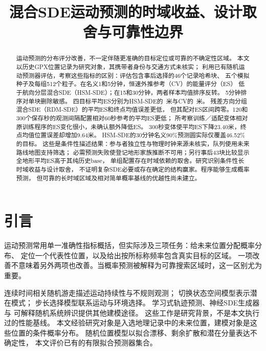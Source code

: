 

\title{混合SDE运动预测的时域收益、设计取舍与可靠性边界}

\pagestyle{plain}
\maketitle
\begin{abstract}
运动预测的分布评分改善，不一定伴随更准确的目标定位或可靠的不确定性区域。
本文以历史GPX位置记录为研究对象，其携带者身份与交通方式未核实；
利用已有随机运动预测器评估，考察这些指标的区别：评估包含事后选择的46个记录哈希块、
五个模拟种子及每组512个粒子。在名义1和5分钟，恒速外推参考（CV）的能量评分（ES）
低于航向分层混合SDE（HSM-SDE）；在15和30分钟，两者样本均值排序反转。
5分钟排序对单块删除敏感。
四目标平均ES分别为HSM-SDE的\FullES\ 米与CV的\InertialES\ 米。
残差方向分组混合SDE（RDM-SDE）的平均ES和终点均值误差更低，
但其配对ES区间跨零。120和300个保存秒的观测间隔配置相对60秒参考的平均ES更低；
所考察训练／适配变体相对原训练程序的ES变化很小，未确认额外降低ES。
300秒变体使平均ES下降23.40米，终点均值位置误差却增加9.64米。
HSM-SDE的30分钟名义90\%预测圆实际仅覆盖46.52\%的目标。
这些是条件性描述结果：参与者独立性与物理时钟来源未核实，队列使用未来路线地图支持筛选；
必需预测失败使登记地形家族推断不可用；另行事后43块比较显示全地形平均ES高于其纯历史base，
单组配置存在时域依赖的取舍。研究识别条件性长时域收益与设计取舍，
不证明复杂SDE必要或存在确定的结构赢家。程序能够生成概率预测，
但可靠的长时域区域及相对简单概率基线的优越性尚未建立。
\end{abstract}

\section{引言}\label{sec:introduction}\hypertarget{sec:introduction}{}
运动预测常用单一准确性指标概括，但实际涉及三项任务：给未来位置分配概率分布、
定位一个代表性位置，以及给出按所标称频率包含真实目标的区域。
一项改善不意味着另外两项也改善。当概率预测被解释为可靠搜索区域时，这一区别尤为重要。

连续时间相关随机游走描述运动持续性与不规则观测\cite{johnson2008}；
切换状态空间模型表示潜在模式\cite{ghahramani2000}；
步长选择模型联系运动与环境选择\cite{avgar2016,avgar2017correction}。
学习式轨迹预测\cite{gupta2018,salzmann2020}、神经SDE生成器\cite{kidger2021}与
可解释随机系统辨识\cite{gao2024}提供其他建模途径。
这些工作是研究背景，不是本文执行过的性能基线。
本文经验研究对象是入选地理记录中的未来位置，建模对象是这些位置的条件概率分布。
随机位置模型以拟合漂移、剩余扩散和潜在分量表达不确定性，
本文评价已有的有限拟合预测器集合。

